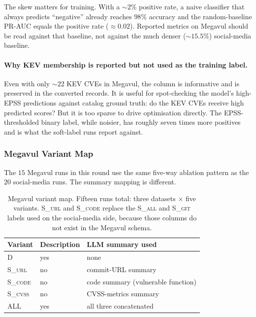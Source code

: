 \documentclass[11pt]{article}
\begin{document}
The skew matters for training. With a $\sim 2\%$ positive rate, a
naive classifier that always predicts ``negative'' already reaches
$98\%$ accuracy and the random-baseline PR-AUC equals the positive
rate ($\approx 0.02$). Reported metrics on Megavul should be read
against that baseline, not against the much denser ($\sim 15.5\%$)
social-media baseline.

\paragraph{Why KEV membership is reported but not used as the training label.}
Even with only $\sim 22$ KEV CVEs in Megavul, the column is informative
and is preserved in the converted records. It is useful for
spot-checking the model's high-EPSS predictions against catalog
ground truth: do the KEV CVEs receive high predicted scores? But it
is too sparse to drive optimisation directly. The EPSS-thresholded
binary label, while noisier, has roughly seven times more positives
and is what the soft-label runs report against.

\subsubsection{Megavul Variant Map}

The $15$ Megavul runs in this round use the same five-way ablation
pattern as the $20$ social-media runs. The summary mapping is
different.

\begin{table}[h]
\centering
\small
\begin{tabular}{lll}
\toprule
Variant & Description & LLM summary used \\
\midrule
\textsc{D}        & yes & none \\
\textsc{S\_url}   & no  & commit-URL summary \\
\textsc{S\_code}  & no  & code summary (vulnerable function) \\
\textsc{S\_cvss}  & no  & CVSS-metrics summary \\
\textsc{ALL}      & yes & all three concatenated \\
\bottomrule
\end{tabular}
\caption{Megavul variant map. Fifteen runs total: three datasets
$\times$ five variants. \textsc{S\_url} and \textsc{S\_code} replace
the \textsc{S\_all} and \textsc{S\_git} labels used on the
social-media side, because those columns do not exist in the Megavul
schema.}
\end{table}
\end{document}
